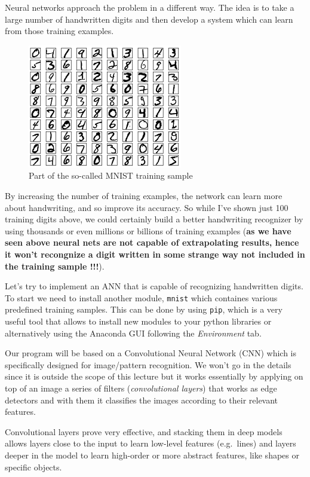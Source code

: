 Neural networks approach the problem in a different way. The idea is to
take a large number of handwritten digits and then develop a system
which can learn from those training examples.

\begin{figure}
\centering
\includegraphics{figures/mnist_100_digits.png}
\caption{Part of the so-called MNIST training sample}
\end{figure}

By increasing the number of training examples, the network can learn
more about handwriting, and so improve its accuracy. So while I've shown
just 100 training digits above, we could certainly build a better
handwriting recognizer by using thousands or even millions or billions
of training examples (\textbf{as we have seen above neural nets are not
capable of extrapolating results, hence it won't recongnize a digit
written in some strange way not included in the training sample !!!}).

Let's try to implement an ANN that is capable of recognizing handwritten
digits. To start we need to install another module, \texttt{mnist} which
containes various predefined training samples. This can be done by using
\texttt{pip}, which is a very useful tool that allows to install new
modules to your python libraries or alternatively using the Anaconda GUI
following the \emph{Environment} tab.

Our program will be based on a Convolutional Neural Network (CNN) which
is specifically designed for image/pattern recognition. We won't go in
the details since it is outside the scope of this lecture but it works
essentially by applying on top of an image a series of filters
(\emph{convolutional layers}) that works as edge detectors and with them
it classifies the images according to their relevant features.

Convolutional layers prove very effective, and stacking them in deep
models allows layers close to the input to learn low-level features
(e.g.~lines) and layers deeper in the model to learn high-order or more
abstract features, like shapes or specific objects.

